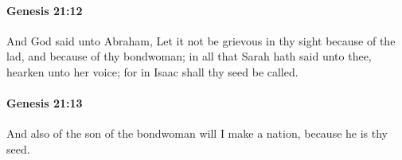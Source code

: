 		\paragraph{Genesis 21:12} %
			\label{GENESIS-21-12}

			And God said unto Abraham, Let it not be grievous in thy sight because of the lad, and because of thy bondwoman; in all that Sarah hath said unto thee, hearken unto her voice; for in Isaac shall thy seed be called.


		\paragraph{Genesis 21:13} %
			\label{GENESIS-21-13}

			And also of the son of the bondwoman will I make a nation, because he is thy seed.


